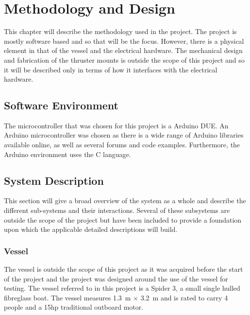 \chapter{Methodology and Design}
This chapter will describe the methodology used in the project. The project is mostly software based and so that will be the focus. However, there is a physical element in that of the vessel and the electrical hardware. The mechanical design and fabrication of the thruster mounts is outside the scope of this project and so it will be described only in terms of how it interfaces with the electrical hardware.\par
\section{Software Environment}
The microcontroller that was chosen for this project is a Arduino DUE. An Arduino microcontroller was chosen as there is a wide range of Arduino libraries available online, as well as several forums and code examples. Furthermore, the Arduino environment uses the C language. \par
\section{System Description}
This section will give a broad overview of the system as a whole and describe the different sub-systems and their interactions. Several of these subsystems are outside the scope of the project but have been included to provide a foundation upon which the applicable detailed descriptions will build.\par
\subsection{Vessel}
The vessel is outside the scope of this project as it was acquired before the start of the project and the project was designed around the use of the vessel for testing. The vessel referred to in this project is a Spider 3, a small single hulled fibreglass boat. The vessel measures \SI{1.3}{\meter} $\times$ \SI{3.2}{\meter} and is rated to carry 4 people and a 15hp traditional outboard motor.\par
